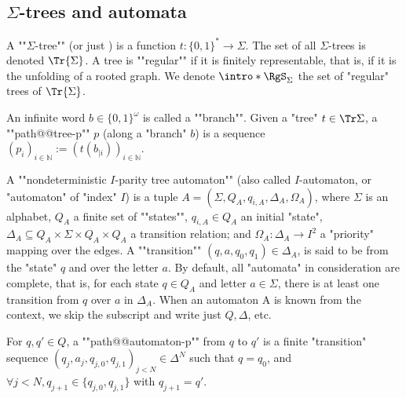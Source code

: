 \documentclass[a4paper,UKenglish,cleveref, autoref, thm-restate]{lipics-v2021}
\newcommand{\NN}{\mathbb{N}}
\begin{document}
\subsection{$\Sigma$-trees and automata}
\AP A ""$\Sigma$-tree"" (or just ) is a function $t : \{0,1\}^* \to \Sigma$. The set of all $\Sigma$-trees is denoted ${\Tr {\Sigma}}$. A tree is ""regular"" if it is finitely representable, that is, if it is the unfolding of a rooted graph. We denote $\intro*\RgS_\Sigma$ the set of "regular" trees of $\Tr{\Sigma}$.

\AP An infinite word $b \in \{0,1\}^\omega$ is called a ""branch"".
Given a  "tree" $t\in \Tr\Sigma$, a ""path@@tree-p"" $p$ (along a "branch" $b$) is a sequence $(p_i)_{i \in \NN} := (t(b_{|i}))_{i\in \NN}$.

\AP A ""nondeterministic $I$-parity tree automaton"" (also called $I$-automaton, or "automaton" of "index" $I$) is
a tuple $A = (\Sigma, Q_A , q_{i,A}, \Delta_A, \Omega_A )$, where $\Sigma$ is an alphabet, $Q_A$ a finite set of ""states"", $q_{i,A} \in Q_A$ an initial "state", $\Delta_A \subseteq Q_A \times \Sigma \times Q_A \times Q_A$ a transition relation; and $\Omega_A : \Delta_A \to I^2$ a "priority" mapping over the edges. 
A ""transition"" $(q, a, q_0 , q_1) \in \Delta_A$, is said to be from the "state" $q$ and over the letter $a$. By default, all "automata" in consideration are complete, that is, for each state $q \in Q_A$ and letter $a\in \Sigma$, there is at least one transition from $q$ over $a$ in $\Delta_A$.
When an automaton A is known from the context, we skip the subscript and write just $Q,\Delta$, etc.

\AP For $q,q' \in Q$, a ""path@@automaton-p"" from $q$ to $q'$ is  a finite "transition" sequence $(q_j, a_j, q_{j,0}, q_{j,1})_{j< N} \in \Delta^N$ such that $q = q_0$, and $\forall j < N, q_{j+1}\in \{q_{j,0}, q_{j,1}\}$ with $q_{j+1} = q'$.
\end{document}
